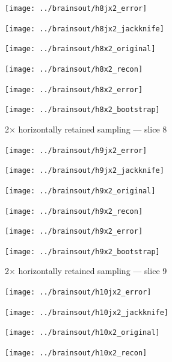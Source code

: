 \documentclass[article]{jdssv}
\begin{document}
\begin{appendix}
\begin{figure}
\begin{centering}
\parbox{\imsize}{\texttt{[image: ../brainsout/h8jx2\_error]}}
\parbox{\imsize}{\texttt{[image: ../brainsout/h8jx2\_jackknife]}}

\vspace{\vertsep}

\parbox{\imsize}{\texttt{[image: ../brainsout/h8x2\_original]}}
\parbox{\imsize}{\texttt{[image: ../brainsout/h8x2\_recon]}}

\vspace{\vertsep}

\parbox{\imsize}{\texttt{[image: ../brainsout/h8x2\_error]}}
\parbox{\imsize}{\texttt{[image: ../brainsout/h8x2\_bootstrap]}}

\end{centering}
\caption{2$\times$ horizontally retained sampling --- slice 8}
\end{figure}


\begin{figure}
\begin{centering}

\parbox{\imsize}{\texttt{[image: ../brainsout/h9jx2\_error]}}
\parbox{\imsize}{\texttt{[image: ../brainsout/h9jx2\_jackknife]}}

\vspace{\vertsep}

\parbox{\imsize}{\texttt{[image: ../brainsout/h9x2\_original]}}
\parbox{\imsize}{\texttt{[image: ../brainsout/h9x2\_recon]}}

\vspace{\vertsep}

\parbox{\imsize}{\texttt{[image: ../brainsout/h9x2\_error]}}
\parbox{\imsize}{\texttt{[image: ../brainsout/h9x2\_bootstrap]}}

\end{centering}
\caption{2$\times$ horizontally retained sampling --- slice 9}
\end{figure}


\begin{figure}
\begin{centering}

\parbox{\imsize}{\texttt{[image: ../brainsout/h10jx2\_error]}}
\parbox{\imsize}{\texttt{[image: ../brainsout/h10jx2\_jackknife]}}

\vspace{\vertsep}

\parbox{\imsize}{\texttt{[image: ../brainsout/h10x2\_original]}}
\parbox{\imsize}{\texttt{[image: ../brainsout/h10x2\_recon]}}

\vspace{\vertsep}


\end{centering}
\end{figure}
\end{appendix}
\end{document}
